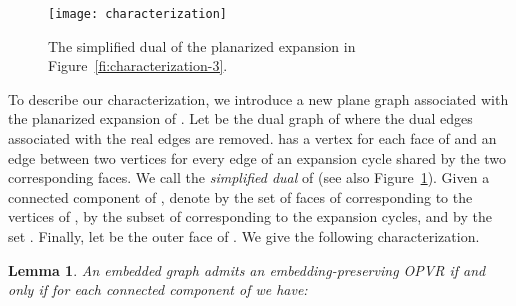 \documentclass{article}
\newtheorem{lemma}{Lemma}
\newcommand{\opvr}{OPVR\xspace}
\begin{document}
\begin{figure}[tb]
    \centering
    	\centering
    	\texttt{[image: characterization]}
    \caption{The simplified dual  of the planarized expansion  in Figure~\ref{fi:characterization-3}.\label{fi:characterization-4}}
\end{figure}

To describe our characterization, we introduce a new plane graph associated with the planarized expansion  of . Let  be the dual graph of  where the dual edges associated with the real edges are removed.   has a vertex for each face of  and an edge between two vertices for every edge of an expansion cycle shared by the two corresponding faces. We call  the \emph{simplified dual} of  (see also Figure~\ref{fi:characterization-4}). Given a connected component  of , denote by  the set of faces of  corresponding to the vertices of , by  the subset of  corresponding to the expansion cycles, and by  the set . Finally, let  be the outer face of . We give the following characterization.

\begin{lemma}\label{le:characterization} 
An embedded graph  admits an embedding-preserving \opvr if and only if for each connected component  of  we have:


\end{lemma}
\end{document}
